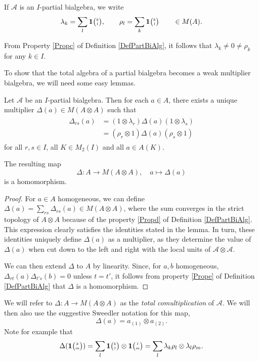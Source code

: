 \begin{Not}
If $\mathscr{A}$ is an $I$-partial bialgebra, we write \[\lambda_k = \sum_l \mathbf{1}{\tiny {\begin{pmatrix} k\\l\end{pmatrix}}},\qquad \rho_l = \sum_k\mathbf{1}{\tiny {\begin{pmatrix} k\\l\end{pmatrix}}} \qquad \in M(A).\]
\end{Not}

\begin{Rem} From Property \ref{Propc} of Definition \ref{DefPartBiAlg}, it follows that $\lambda_k\neq 0\neq \rho_k$ for any $k\in I$. 
\end{Rem} 

To show that the total algebra of a partial bialgebra becomes a weak multiplier bialgebra, we will need some easy lemmas. 

\begin{Lem} Let $\mathscr{A}$ be an $I$-partial bialgebra. Then for each $a\in A$, there exists a unique multiplier $\Delta(a) \in M(A\otimes A)$ such that \begin{align}\label{EqDel}
    \begin{aligned}
      \Delta_{rs}(a) &= (1\otimes \lambda_r)\Delta(a)(1\otimes
      \lambda_s) \\ &= (\rho_r\otimes 1)\Delta(a)(\rho_s\otimes 1)
    \end{aligned}
\end{align}  for all $r,s\in I$, all $K\in M_2(I)$ and all $a\in A(K)$. 

The resulting map \[\Delta:A\rightarrow M(A\otimes A),\quad a\mapsto \Delta(a)\] is a homomorphism.
\end{Lem} %
\begin{proof} For $a\in A$ homogeneous, we can define $\Delta(a) = \sum_{rs} \Delta_{rs}(a) \in M(A\otimes A)$, where the sum converges in the strict topology of $A\otimes A$ because of the property \ref{Propd} of Definition \ref{DefPartBiAlg}. This expression clearly satisfies the identities stated in the lemma. In turn, these identities uniquely define $\Delta(a)$ as a multiplier, as they determine the value of $\Delta(a)$ when cut down to the left and right with the local units of $\mathscr{A}\otimes \mathscr{A}$.

We can then extend $\Delta$ to $A$ by linearity. Since, for $a,b$ homogeneous, $\Delta_{rt}(a)\Delta_{t's}(b)=0$ unless $t=t'$, it follows from property \ref{Prope} of Definition \ref{DefPartBiAlg} that $\Delta$ is a homomorphism. 
\end{proof}

We will refer to $\Delta: A\rightarrow M(A\otimes A)$ as the \emph{total comultiplication} of $\mathscr{A}$. We will then also use the suggestive Sweedler notation for this map, \[\Delta(a) = a_{(1)}\otimes a_{(2)}.\] Note for example that \[\Delta(\mathbf{1}{\tiny {\begin{pmatrix} k\\m\end{pmatrix}}}) = \sum_{l}\mathbf{1}{\tiny {\begin{pmatrix} k\\l\end{pmatrix}}}\otimes \mathbf{1}{\tiny {\begin{pmatrix} l\\m\end{pmatrix}}} = \sum_l \lambda_k\rho_l\otimes \lambda_l\rho_m.\]

